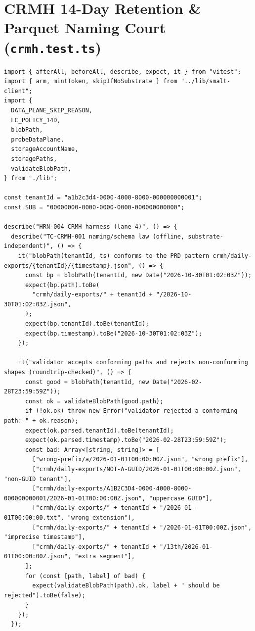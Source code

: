 \documentclass[10pt,twoside,openany]{book}
\theoremstyle{plain}
\theoremstyle{definition}
\theoremstyle{remark}
\begin{document}
\section{CRMH 14-Day Retention \& Parquet Naming Court (\texttt{crmh.test.ts})}
\begin{lstlisting}[caption={apps/web/test/harness/crmh/crmh.test.ts}]
import { afterAll, beforeAll, describe, expect, it } from "vitest";
import { arm, mintToken, skipIfNoSubstrate } from "../lib/smalt-client";
import {
  DATA_PLANE_SKIP_REASON,
  LC_POLICY_14D,
  blobPath,
  probeDataPlane,
  storageAccountName,
  storagePaths,
  validateBlobPath,
} from "./lib";

const tenantId = "a1b2c3d4-0000-4000-8000-000000000001";
const SUB = "00000000-0000-0000-0000-000000000000";

describe("HRN-004 CRMH harness (lane 4)", () => {
  describe("TC-CRMH-001 naming/schema law (offline, substrate-independent)", () => {
    it("blobPath(tenantId, ts) conforms to the PRD pattern crmh/daily-exports/{tenantId}/{timestamp}.json", () => {
      const bp = blobPath(tenantId, new Date("2026-10-30T01:02:03Z"));
      expect(bp.path).toBe(
        "crmh/daily-exports/" + tenantId + "/2026-10-30T01:02:03Z.json",
      );
      expect(bp.tenantId).toBe(tenantId);
      expect(bp.timestamp).toBe("2026-10-30T01:02:03Z");
    });

    it("validator accepts conforming paths and rejects non-conforming shapes (roundtrip-checked)", () => {
      const good = blobPath(tenantId, new Date("2026-02-28T23:59:59Z"));
      const ok = validateBlobPath(good.path);
      if (!ok.ok) throw new Error("validator rejected a conforming path: " + ok.reason);
      expect(ok.parsed.tenantId).toBe(tenantId);
      expect(ok.parsed.timestamp).toBe("2026-02-28T23:59:59Z");
      const bad: Array<[string, string]> = [
        ["wrong-prefix/a/2026-01-01T00:00:00Z.json", "wrong prefix"],
        ["crmh/daily-exports/NOT-A-GUID/2026-01-01T00:00:00Z.json", "non-GUID tenant"],
        ["crmh/daily-exports/A1B2C3D4-0000-4000-8000-000000000001/2026-01-01T00:00:00Z.json", "uppercase GUID"],
        ["crmh/daily-exports/" + tenantId + "/2026-01-01T00:00:00.txt", "wrong extension"],
        ["crmh/daily-exports/" + tenantId + "/2026-01-01T00:00Z.json", "imprecise timestamp"],
        ["crmh/daily-exports/" + tenantId + "/13th/2026-01-01T00:00:00Z.json", "extra segment"],
      ];
      for (const [path, label] of bad) {
        expect(validateBlobPath(path).ok, label + " should be rejected").toBe(false);
      }
    });
  });


\end{lstlisting}
\end{document}
